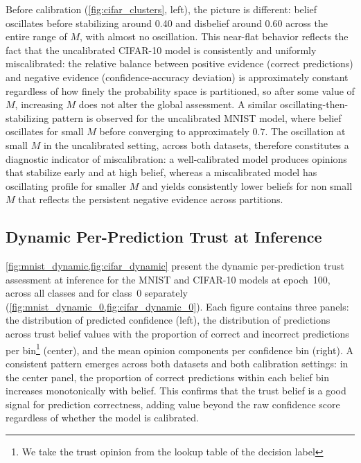 Before calibration (\cref{fig:cifar_clusters}, left), the picture is different: belief oscillates before stabilizing around 0.40 and disbelief around 0.60 across the entire range of $M$, with almost no oscillation. This near-flat behavior reflects the fact that the uncalibrated CIFAR-10 model is consistently and uniformly miscalibrated: the relative balance between positive evidence (correct predictions) and negative evidence (confidence-accuracy deviation) is approximately constant regardless of how finely the probability space is partitioned, so after some value of $M$, increasing $M$ does not alter the global assessment. A similar oscillating-then-stabilizing pattern is observed for the uncalibrated MNIST model, where belief oscillates for small $M$ before converging to approximately $0.7$. The oscillation at small $M$ in the uncalibrated setting, across both datasets, therefore constitutes a diagnostic indicator of miscalibration: a well-calibrated model produces opinions that stabilize early and at high belief, whereas a miscalibrated model has oscillating profile for smaller $M$ and yields consistently lower beliefs for non small $M$ that reflects the persistent negative evidence across partitions.

\subsection{Dynamic Per-Prediction Trust at Inference}
\label{subsec:dynamic}

\cref{fig:mnist_dynamic,fig:cifar_dynamic} present the dynamic per-prediction trust assessment at inference for the MNIST and CIFAR-10 models at epoch~100, across all classes and for class~0 separately (\cref{fig:mnist_dynamic_0,fig:cifar_dynamic_0}). Each figure contains three panels: the distribution of predicted confidence (left), the distribution of predictions across trust belief values with the proportion of correct and incorrect predictions per bin\footnote{We take the trust opinion from the lookup table of the decision label} (center), and the mean opinion components per confidence bin (right). A consistent pattern emerges across both datasets and both calibration settings: in the center panel, the proportion of correct predictions within each belief bin increases monotonically with belief. This confirms that the trust belief is a good signal for prediction correctness, adding value beyond the raw confidence score regardless of whether the model is calibrated.

